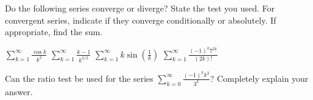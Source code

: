 \documentclass[12pt]{exam}
\newcommand{\sk}{\sum_{k=1}^\infty}
\begin{document}
\begin{questions}

Do the following series converge or diverge?  State the 
test you used.  For convergent series, indicate if they
 converge conditionally or absolutely.  If appropriate,
find the sum.


\question $\displaystyle{\sk \frac {\cos k}{k^2}}$
\vspace{2in}
\question $\displaystyle{\sk\frac {k-1}{k^{3/2}}}$
\vspace{2in}
\question $\displaystyle{\sk k{\sin(\frac{1}{k})}}$
\vspace{2in}
\question $\displaystyle{ \sk \frac {(-1)^k 7^{2k}}{(2k)!}}$


\vspace{2in}
\question Can the ratio test be used for the series $\sum_{k=0}^\infty 
\displaystyle \frac{(-1)^k k^2}{3^k}$?  Completely explain your answer.





\end{questions}
\end{document}
